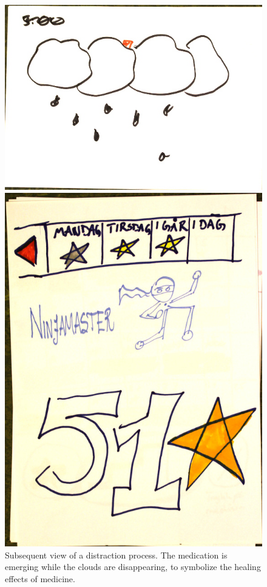 \begin{figure}
	\begin{minipage}[b]{0.46\linewidth}
		\centering
			\includegraphics[width=0.34\paperwidth]{Pictures/DesignWorkshop/MedicationViewEmergingMedicine}
		\caption[Distraction view 2 from design workshop]{Subsequent view of a distraction process. The medication is emerging while the clouds are disappearing, to symbolize the healing effects of medicine.}
		\label{fig:dwMediationViewEmergingMedicine}
	\end{minipage}
	\hspace{1cm}
	\begin{minipage}[b]{0.46\linewidth}
		\centering
		\includegraphics[width=0.34\paperwidth]{Pictures/DesignWorkshop/ChildRewardsView}

\end{minipage}
\end{figure}

